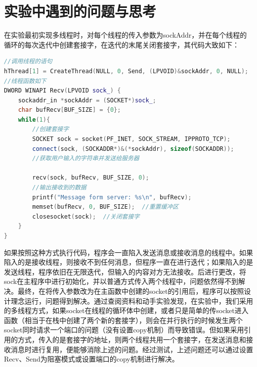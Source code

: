 \documentclass{article}
\begin{document}
\section{实验中遇到的问题与思考}
在实验最初实现多线程时，对每个线程的传入参数为sockAddr，并在每个线程的循环的每次迭代中创建套接字，在迭代的末尾关闭套接字，其代码大致如下：\\
\begin{lstlisting}[language = c++, title = 最初的错误代码]
//调用线程的语句
hThread[1] = CreateThread(NULL, 0, Send, (LPVOID)&sockAddr, 0, NULL);
//线程函数如下
DWORD WINAPI Recv(LPVOID sock_) {
	sockaddr_in *sockAddr = (SOCKET*)sock_;
    char bufRecv[BUF_SIZE] = {0};
    while(1){
        //创建套接字
        SOCKET sock = socket(PF_INET, SOCK_STREAM, IPPROTO_TCP);
        connect(sock, (SOCKADDR*)&(*sockAddr), sizeof(SOCKADDR));
        //获取用户输入的字符串并发送给服务器

        recv(sock, bufRecv, BUF_SIZE, 0);
        //输出接收到的数据
        printf("Message form server: %s\n", bufRecv);
        memset(bufRecv, 0, BUF_SIZE);  //重置缓冲区
        closesocket(sock);  //关闭套接字
    }
}
\end{lstlisting}
如果按照这种方式执行代码，程序会一直陷入发送消息或接收消息的线程中。如果陷入的是接收线程，则接收不到任何消息，但程序一直在进行迭代；如果陷入的是发送线程，程序依旧在无限迭代，但输入的内容对方无法接收。后进行更改，将sock在主程序中进行初始化，并以普通方式传入两个线程中，问题依然得不到解决。最终，在将传入参数改为在主函数中创建的socket的引用后，程序可以按照设计理念运行，问题得到解决。通过查阅资料和动手实验发现，在实验中，我们采用的多线程方式，如果socket在线程的循环体中创建，或者只是简单的传socket进入函数（相当于在栈中创建了两个新的套接字），则会在并行执行的时候发生两个socket同时请求一个端口的问题（没有设置copy机制）而导致错误。但如果采用引用的方式，传入的是套接字的地址，则两个线程共用一个套接字，在发送消息和接收消息时进行复用，便能够消除上述的问题。经过测试，上述问题还可以通过设置Recv、Send为阻塞模式或设置端口的copy机制进行解决。
\end{document}
